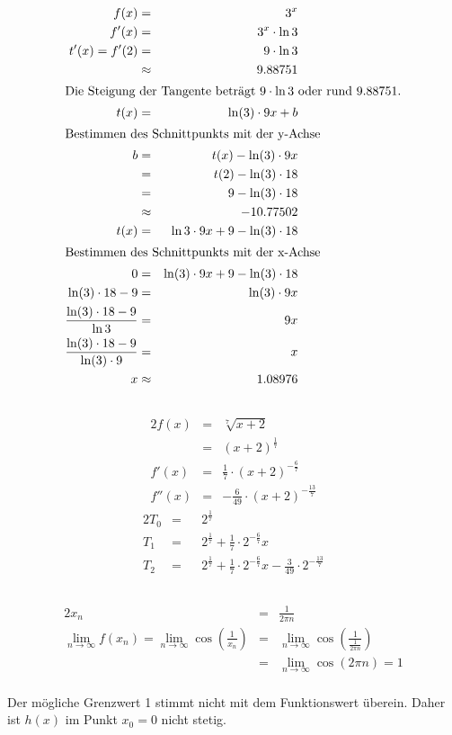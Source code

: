 \documentclass[10pt,a4paper,oneside,ngerman,numbers=noenddot]{scrartcl}
\begin{document}
\subsection{} %
\begin{alignat*}{2}
f(x) &=& 3^{x} \\
f'(x) &=& 3^{x} \cdot \ln 3 \\
t'(x) = f'(2) &=& 9 \cdot \ln 3 \\
&\approx & 9.88751 \\
\intertext{Die Steigung der Tangente beträgt $9 \cdot \ln 3$ oder rund $9.88751$.}
t(x) &=& \ln (3) \cdot 9x + b \\
\intertext{Bestimmen des Schnittpunkts mit der y-Achse}
b &=& t(x) - \ln (3) \cdot 9x \\
&=& t(2) - \ln (3) \cdot 18 \\
&=& 9 - \ln (3) \cdot 18 \\
&\approx & -10.77502  \\
t(x) &=& \ln 3 \cdot 9x + 9 - \ln (3) \cdot 18 \\
\intertext{Bestimmen des Schnittpunkts mit der x-Achse}
0 &=& \ln (3) \cdot 9x + 9 - \ln (3) \cdot 18 \\
\ln (3) \cdot 18 - 9 &=& \ln (3) \cdot 9x \\
\frac{\ln (3) \cdot 18 - 9}{\ln 3} &=& 9x \\
\frac{\ln (3) \cdot 18 - 9}{\ln (3) \cdot 9} &=& x \\
x &\approx & 1.08976
\end{alignat*}
\subsection{} %
\begin{alignat*}{2}
f(x) &=& \sqrt[7]{x+2} \\
&=& (x+2)^{\frac{1}{7}} \\
f'(x) &=& \frac{1}{7} \cdot (x+2)^{-\frac{6}{7}} \\
f''(x) &=& -\frac{6}{49} \cdot (x+2)^{-\frac{13}{7}}
\end{alignat*}
\begin{alignat*}{2}
T_{0} &=&& 2^{\frac{1}{7}} \\
T_{1} &=&& 2^{\frac{1}{7}} + \frac{1}{7} \cdot 2^{-\frac{6}{7}}x \\
T_{2} &=&& 2^{\frac{1}{7}} + \frac{1}{7} \cdot 2^{-\frac{6}{7}}x - \frac{3}{49} \cdot 2^{-\frac{13}{7}}
\end{alignat*}
\subsection{} %
\begin{alignat*}{2}
x_{n} &=& \frac{1}{2\pi n} \\
\lim\limits_{n\rightarrow \infty} f(x_{n}) = \lim\limits_{n\rightarrow \infty} \cos \left(\frac{1}{x_{n}} \right) &=&  \lim\limits_{n\rightarrow \infty} \cos \left(\frac{1}{\frac{1}{2 \pi n}} \right) \\
&=& \lim\limits_{n\rightarrow \infty} \cos (2 \pi n) = 1
\end{alignat*} \\
Der mögliche Grenzwert 1 stimmt nicht mit dem Funktionswert überein. Daher ist $h(x)$ im Punkt $x_{0}=0$ nicht stetig.
\end{document}
